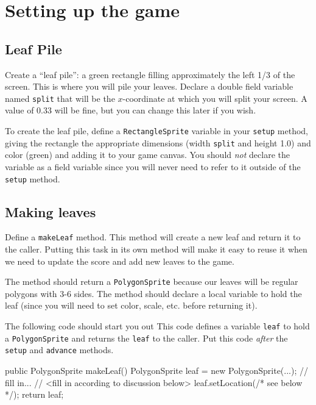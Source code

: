 \documentclass[12pt]{article}
\newenvironment{qv}%
  {\quote
   \verbatim}%
  {\endverbatim
   \endquote}
\newcommand{\code}{\texttt}
\begin{document}
\section*{Setting up the game}

\subsection*{Leaf Pile}

Create a ``leaf pile'': a green rectangle filling approximately the
left 1/3 of the screen. This is where you will pile your leaves.
Declare a double field variable named \code{split}
that will be the $x$-coordinate at which you will split your screen.
A value of 0.33 will be fine, but you can change this later
if you wish.

To create the leaf pile, define a \code{RectangleSprite} variable
in your \code{setup} method,
giving the rectangle the appropriate dimensions
(width \code{split} and height 1.0) and color (green)
and adding it to your game canvas.
You should {\em not} declare the variable as a field variable
since you will never need to refer to it outside of the \code{setup} method.

\subsection*{Making leaves}

Define a \code{makeLeaf} method.
This method will create a new leaf
and return it to the caller.
Putting this task in its own method
will make it easy to reuse it when we need to update the score and add new
leaves to the game.

The method should return a \code{PolygonSprite} because our leaves
will be regular polygons with 3-6 sides. The method should declare a
local variable to hold the leaf (since you will need to set color,
scale, etc. before returning it).

The following code should start you out
This code defines a variable \code{leaf} to hold a \code{PolygonSprite}
and returns the \code{leaf} to the caller.
Put this code {\em after} the \code{setup} and \code{advance} methods.

\begin{qv}
public PolygonSprite makeLeaf() {
  PolygonSprite leaf = new PolygonSprite(...); // fill in...
  // <fill in according to discussion below>
  leaf.setLocation(/* see below */);
  return leaf;
}
\end{qv}
\end{document}
